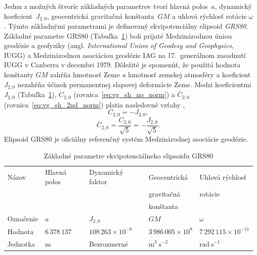 \documentclass[a4paper,12pt]{book}
\begin{document}
Jednu z možných štvoríc základných parametrov tvorí hlavná polos~$a$, dynamický 
koeficient~$J_{2,0}$, geocentrická gravitačná konštanta~$GM$ a uhlová rýchlosť 
rotácie $\omega$.  Týmto základnými parametrami je definovaný ekvipotenciálny 
elipsoid \emph{GRS80}.  Základné parametre GRS80 (Tabuľka~\ref{tab:1}) boli 
prijaté Medzinárodnou úniou geodézie a geofyziky (angl. \textit{International 
Union of Geodesy and Geophysics}, IUGG) a Medzinárodnou asociáciou geodézie IAG 
na 17.~generálnom zasadnutí IUGG v Canberra v decembri 1979.  Dôležité je 
spomenúť, že použitá hodnota konštanty $GM$ zahŕňa hmotnosť Zeme \emph{a} 
hmotnosť zemskej atmosféry a koeficient $J_{2,0}$ nezahŕňa účinok permanentnej 
slapovej deformácie Zeme.  Medzi koeficientmi $J_{2,0}$ (Tabuľka~\ref{tab:1}), 
$C_{2,0}$ (rovnica~\ref{eq:vg_sh_no_norm}) a $\bar{C}_{2,0}$ 
(rovnica~\ref{eq:vg_sh_2nd_norm}) platia nasledovné vzťahy 
\parencite{Moritz1967,MoritzPhysicalGeodesy},
%
\begin{equation}
C_{2,0} = -J_{2,0}{,}
\end{equation}
%
\begin{equation}
\bar{C}_{2,0} = \frac{C_{2,0}}{\sqrt{5}} = -\frac{J_{2,0}}{\sqrt{5}}{.}
\end{equation}
%
Elipsoid GRS80 je oficiálny referenčný systém Medzinárodnej asociácie geodézie.

\begin{table}
\begin{center}
\caption{Základné parametre ekvipotenciálneho elipsoidu GRS80 
\parencite{GRS80}}
\label{tab:1}
\begin{tabular}{l l l l l}
\hline
Názov     & Hlavná polos & Dynamický faktor & Geocentrická & Uhlová rýchlosť \\
          &              &                  & gravitačná  &  rotácie\\
          &              &                  & konštanta               & \\
\hline
Označenie & $a$ & $J_{2,0}$ & $GM$ & $\omega$\\
Hodnota   & $6\,378\,137$ & $108\,263 \times 10^{-8}$ & $3\,986\,005 \times 
10^8$ & $7\,292\,115 \times 10^{-11}$\\
Jednotka  & $\mathrm{m}$ & Bezrozmerné & $\mathrm{m}^3 \ \mathrm{s}^{-2}$ 
& $\mathrm{rad} \ \mathrm{s}^{-1}$\\
\hline
\end{tabular}
\end{center}
\end{table}
\end{document}
